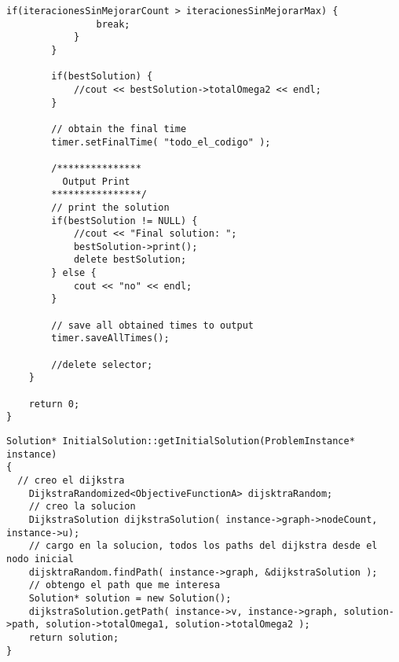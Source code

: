 \begin{lstlisting}[caption=grasp.cpp]
            if(iteracionesSinMejorarCount > iteracionesSinMejorarMax) {      
                break;
            }
        }  

        if(bestSolution) {
            //cout << bestSolution->totalOmega2 << endl;
        }

        // obtain the final time
        timer.setFinalTime( "todo_el_codigo" );

        /***************
          Output Print
        ****************/
        // print the solution
        if(bestSolution != NULL) {
            //cout << "Final solution: ";
            bestSolution->print();
            delete bestSolution;
        } else {
            cout << "no" << endl;
        }    
        
        // save all obtained times to output
        timer.saveAllTimes();

        //delete selector;
    }    
    
    return 0;
}
\end{lstlisting}
\begin{lstlisting}[caption=InitialSolution::getInitialSolution()]
Solution* InitialSolution::getInitialSolution(ProblemInstance* instance)
{    
  // creo el dijkstra
    DijkstraRandomized<ObjectiveFunctionA> dijsktraRandom;
    // creo la solucion
    DijkstraSolution dijkstraSolution( instance->graph->nodeCount, instance->u);
    // cargo en la solucion, todos los paths del dijkstra desde el nodo inicial
    dijsktraRandom.findPath( instance->graph, &dijkstraSolution );
    // obtengo el path que me interesa
    Solution* solution = new Solution();    
    dijkstraSolution.getPath( instance->v, instance->graph, solution->path, solution->totalOmega1, solution->totalOmega2 );
    return solution;
}
\end{lstlisting}
